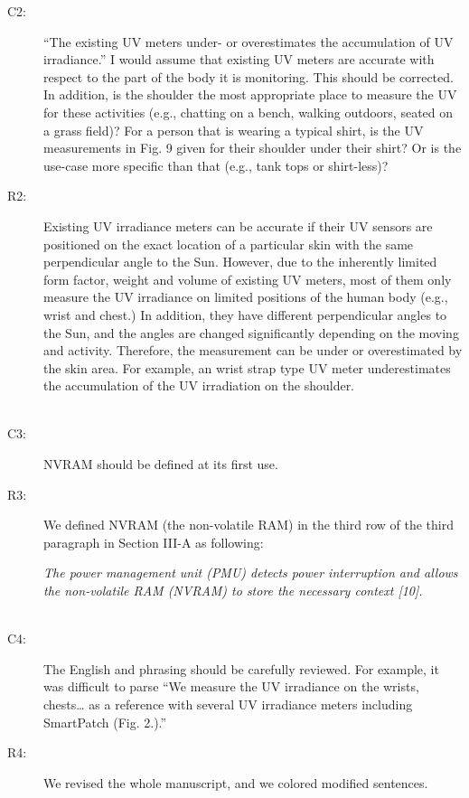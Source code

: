 \documentclass[onecolumn]{IEEEconf}
\begin{document}
\begin{description}
\item [C2: ] ``The existing UV meters under- or overestimates the accumulation of UV irradiance.'' I would assume that existing UV meters are accurate with respect to the part of the body it is monitoring. This should be corrected. In addition, is the shoulder the most appropriate place to measure the UV for these activities (e.g., chatting on a bench, walking outdoors, seated on a grass field)? For a person that is wearing a typical shirt, is the UV measurements in Fig. 9 given for their shoulder under their shirt? Or is the use-case more specific than that (e.g., tank tops or shirt-less)?
\item [R2: ] 
Existing UV irradiance meters can be accurate if their UV sensors are positioned on the exact location of a particular skin with the same perpendicular angle to the Sun. However, due to the inherently limited form factor, weight and volume of existing UV meters, most of them only measure the UV irradiance on limited positions of the human body (e.g., wrist and chest.) In addition, they have different perpendicular angles to the Sun, and the angles are changed significantly depending on the moving and activity. Therefore, the measurement can be under or overestimated by the skin area. For example, an wrist strap type UV meter underestimates the accumulation of the UV irradiation on the shoulder.\\ 
~\\

\item [C3: ] NVRAM should be defined at its first use.
\item [R3: ] We defined NVRAM (the non-volatile RAM) in the third row of the third paragraph in Section III-A as following:

\textit{The power management unit (PMU) detects power interruption and allows the non-volatile RAM (NVRAM) to store the necessary context [10].}\\
~\\

\item [C4:] The English and phrasing should be carefully reviewed. For example, it was difficult to parse ``We measure the UV irradiance on the wrists, chests… as a reference with several UV irradiance meters including SmartPatch (Fig. 2.).'' 

\item [R4: ] We revised the whole manuscript, and we colored modified sentences. \\


\end{description}
\end{document}
